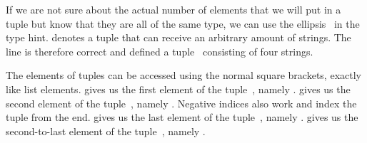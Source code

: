 %
\begin{sloppypar}%
If we are not sure about the actual number of elements that we will put in a tuple but know that they are all of the same type, we can use the ellipsis~ in the type hint.
 denotes a tuple that can receive an arbitrary amount of strings.
The line  is therefore correct and defined a tuple~ consisting of four strings.%
\end{sloppypar}%
%
The elements of tuples can be accessed using the normal square brackets, exactly like list elements.
 gives us the first element of the tuple~, namely .
 gives us the second element of the tuple~, namely .
Negative indices also work and index the tuple from the end.
 gives us the last element of the tuple~, namely .
 gives us the second-to-last element of the tuple~, namely .

